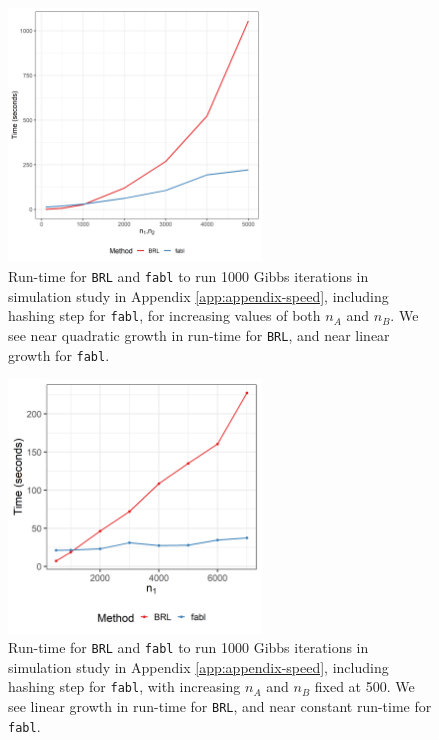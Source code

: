 \documentclass[ba]{imsart}
\begin{document}
	\begin{figure}[h!]
		\begin{center} \includegraphics[width=0.6\textwidth]{../notes/figures/sadinle_speed_plot_slides2} 
			\caption{Run-time for \texttt{BRL} and \texttt{fabl} to run 1000 Gibbs iterations in simulation study in Appendix \ref{app:appendix-speed}, including hashing step for \texttt{fabl}, for increasing values of both $n_A$ and $n_B$. We see near quadratic growth in run-time for \texttt{BRL}, and near linear growth for \texttt{fabl}.}\label{fig:app-speed1}
		\end{center}
	\end{figure}
	
	\begin{figure}[h!]
		\begin{center} \includegraphics[width=0.6\textwidth]{../notes/figures/speed_plot_fixed_nB_slides2} 
			\caption{Run-time for \texttt{BRL} and \texttt{fabl} to run 1000 Gibbs iterations in simulation study in Appendix \ref{app:appendix-speed}, including hashing step for \texttt{fabl}, with increasing $n_A$ and $n_B$ fixed at 500. We see linear growth in run-time for \texttt{BRL}, and near constant run-time for \texttt{fabl}.}\label{fig:app-speed2}
		\end{center}
	\end{figure}
\end{document}
